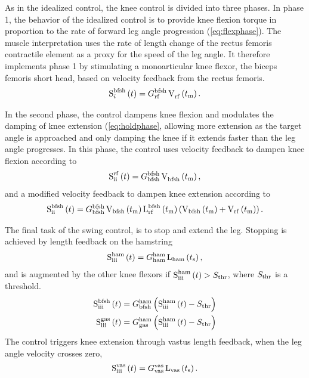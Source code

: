 As in the idealized control, the knee control is divided into three phases. In
phase 1, the behavior of the idealized control is to provide knee flexion torque
in proportion to the rate of forward leg angle progression
(\cref{eq:flexphase}). The muscle interpretation uses the rate of length change
of the rectus femoris contractile element as a proxy for the speed of the leg
angle. It therefore implements phase 1 by stimulating a monoarticular knee
flexor, the biceps femoris short head, based on velocity feedback from the
rectus femoris.
\begin{align}
    \func{S}[i][\tn{bfsh}]{t} = G_\tn{rf}^\tn{bfsh}\func{V}[\tn{rf}][]{t_\tn{m}}.
\end{align}

In the second phase, the control dampens knee flexion and modulates the damping
of knee extension (\cref{eq:holdphase}, allowing more extension as the target
angle is approached and only damping the knee if it extends faster than the leg
angle progresses. In this phase, the control uses velocity feedback to dampen
knee flexion according to
\begin{align}
    \func{S}[\tn{ii}][\tn{rf}]{t} = G_\tn{bfsh}^\tn{bfsh}
        \func{V}[\tn{bfsh}][]{t_\tn{m}},
\end{align}
and a modified velocity feedback to dampen knee extension according to
\begin{align}
    \func{S}[\tn{ii}][\tn{bfsh}]{t} = G_\tn{bfsh}^\tn{bfsh}
        \func{V}[\tn{bfsh}]{t_\tn{m}} \func{L}[\tn{rf}][\tn{bfsh}]{t_\tn{m}} 
        \left( \func{V}[\tn{bfsh}]{t_\tn{m}} + \func{V}[\tn{rf}]{t_\tn{m}}
        \right).
\end{align}

The final task of the swing control, is to stop and extend the leg. Stopping is
achieved by length feedback on the hamstring
\begin{align}
    \func{S}[\tn{iii}][\tn{ham}]{t} = G_\tn{ham}^\tn{ham}
        \func{L}[\tn{ham}]{t_\tn{s}},
\end{align}
and is augmented by the other knee flexors if $\func{S}[\tn{iii}][\tn{ham}]{t} >
S_\tn{thr}$, where $S_{\mathrm{thr}}$ is a threshold.
\begin{align}
    \func{S}[\tn{iii}][\tn{bfsh}]{t} &= G_\tn{bfsh}^\tn{ham}
        \left (\func{S}[\tn{iii}][\tn{ham}]{t} - S_\tn{thr} \right) \\
    \func{S}[\tn{iii}][\tn{gas}]{t} &= G_\tn{gas}^\tn{ham}
        \left (\func{S}[\tn{iii}][\tn{ham}]{t} - S_\tn{thr} \right)
\end{align}
The control triggers knee extension through vastus length feedback, when the leg
angle velocity crosses zero,
\begin{align}
    \func{S}[\tn{iii}][\tn{vas}]{t} = G_\tn{vas}^\tn{vas}
        \func{L}[\tn{vas}]{t_\tn{s}}.
\end{align}

